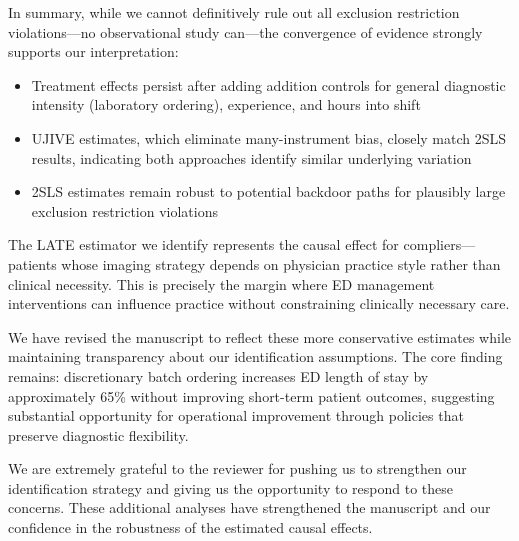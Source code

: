 \documentclass[11pt]{article}
\newcommand{\1}{\hbox{\rm 1\kern-.35em 1}}
\begin{document}
In summary, while we cannot definitively rule out all exclusion restriction violations---no observational study can---the convergence of evidence strongly supports our interpretation:

\begin{itemize}
\item Treatment effects persist after adding addition controls for general diagnostic intensity (laboratory ordering), experience, and hours into shift
\item UJIVE estimates, which eliminate many-instrument bias, closely match 2SLS results, indicating both approaches identify similar underlying variation
\item 2SLS estimates remain robust to potential backdoor paths for plausibly large exclusion restriction violations
\end{itemize}

The LATE estimator we identify represents the causal effect for compliers---patients whose imaging strategy depends on physician practice style rather than clinical necessity. This is precisely the margin where ED management interventions can influence practice without constraining clinically necessary care.

We have revised the manuscript to reflect these more conservative estimates while maintaining transparency about our identification assumptions. The core finding remains: discretionary batch ordering increases ED length of stay by approximately 65\% without improving short-term patient outcomes, suggesting substantial opportunity for operational improvement through policies that preserve diagnostic flexibility.

We are extremely grateful to the reviewer for pushing us to strengthen our identification strategy and giving us the opportunity to respond to these concerns. These additional analyses have strengthened the manuscript and our confidence in the robustness of the estimated causal effects.

\color{black}
\end{document}
